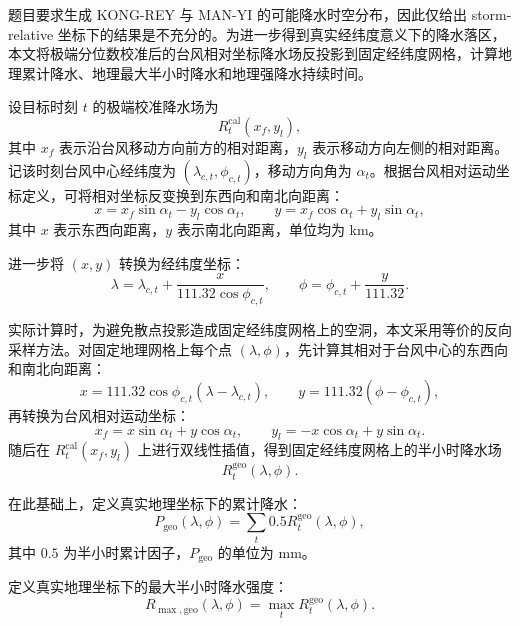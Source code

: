 \documentclass[UTF8,a4paper,zihao=5,fontset=fandol]{ctexart}
\numberwithin{equation}{section}
\numberwithin{figure}{section}
\numberwithin{table}{section}
\begin{document}
题目要求生成 KONG-REY 与 MAN-YI 的可能降水时空分布，因此仅给出 storm-relative 坐标下的结果是不充分的。为进一步得到真实经纬度意义下的降水落区，本文将极端分位数校准后的台风相对坐标降水场反投影到固定经纬度网格，计算地理累计降水、地理最大半小时降水和地理强降水持续时间。

设目标时刻 $t$ 的极端校准降水场为
\begin{equation}
R_t^{\mathrm{cal}}(x_f,y_l),
\end{equation}
其中 $x_f$ 表示沿台风移动方向前方的相对距离，$y_l$ 表示移动方向左侧的相对距离。记该时刻台风中心经纬度为 $(\lambda_{c,t},\phi_{c,t})$，移动方向角为 $\alpha_t$。根据台风相对运动坐标定义，可将相对坐标反变换到东西向和南北向距离：
\begin{equation}
x=x_f\sin\alpha_t-y_l\cos\alpha_t,
\qquad
y=x_f\cos\alpha_t+y_l\sin\alpha_t,
\end{equation}
其中 $x$ 表示东西向距离，$y$ 表示南北向距离，单位均为 km。

进一步将 $(x,y)$ 转换为经纬度坐标：
\begin{equation}
\lambda=\lambda_{c,t}
+\frac{x}{111.32\cos\phi_{c,t}},
\qquad
\phi=\phi_{c,t}
+\frac{y}{111.32}.
\end{equation}

实际计算时，为避免散点投影造成固定经纬度网格上的空洞，本文采用等价的反向采样方法。对固定地理网格上每个点 $(\lambda,\phi)$，先计算其相对于台风中心的东西向和南北向距离：
\begin{equation}
x=111.32\cos\phi_{c,t}(\lambda-\lambda_{c,t}),
\qquad
y=111.32(\phi-\phi_{c,t}),
\end{equation}
再转换为台风相对运动坐标：
\begin{equation}
x_f=x\sin\alpha_t+y\cos\alpha_t,
\qquad
y_l=-x\cos\alpha_t+y\sin\alpha_t.
\end{equation}
随后在 $R_t^{\mathrm{cal}}(x_f,y_l)$ 上进行双线性插值，得到固定经纬度网格上的半小时降水场
\begin{equation}
R_t^{\mathrm{geo}}(\lambda,\phi).
\end{equation}

在此基础上，定义真实地理坐标下的累计降水：
\begin{equation}
P_{\mathrm{geo}}(\lambda,\phi)
=
\sum_t 0.5 R_t^{\mathrm{geo}}(\lambda,\phi),
\end{equation}
其中 $0.5$ 为半小时累计因子，$P_{\mathrm{geo}}$ 的单位为 mm。

定义真实地理坐标下的最大半小时降水强度：
\begin{equation}
R_{\max,\mathrm{geo}}(\lambda,\phi)
=
\max_t R_t^{\mathrm{geo}}(\lambda,\phi).
\end{equation}
\end{document}
